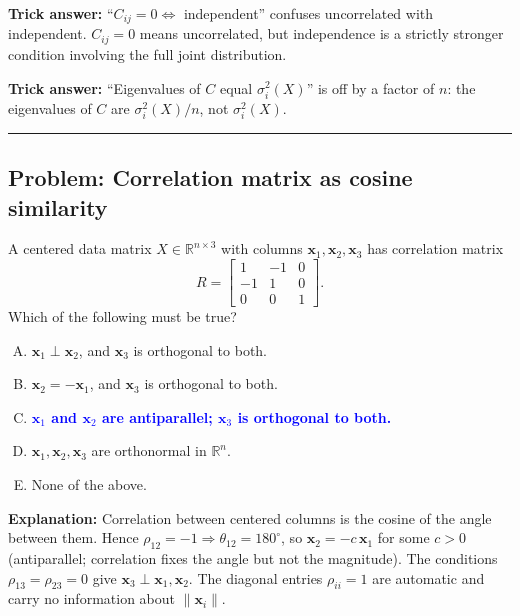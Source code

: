 \documentclass[12pt]{amsart}
\newcommand{\divider}{
  \vspace{-1em}
  \noindent
  \raisebox{-0.15ex}{\textbullet}%
  \hspace{0.5em}%
  \rule[0.5ex]{0.95\textwidth}{1.0pt}%
  \hspace{0.5em}%
  \raisebox{-0.15ex}{\textbullet}%
  \vspace{0em}
}
\begin{document}
\textbf{Trick answer:}
``$C_{ij} = 0 \Leftrightarrow$ independent'' confuses uncorrelated with
independent. $C_{ij} = 0$ means uncorrelated, but independence is a strictly
stronger condition involving the full joint distribution.

\textbf{Trick answer:}
``Eigenvalues of $C$ equal $\sigma_i^2(X)$'' is off by a factor of $n$:
the eigenvalues of $C$ are $\sigma_i^2(X)/n$, not $\sigma_i^2(X)$.

\divider

\subsection*{Problem: Correlation matrix as cosine similarity}

A centered data matrix $X \in \mathbb{R}^{n \times 3}$ with columns
$\mathbf{x}_1, \mathbf{x}_2, \mathbf{x}_3$ has correlation matrix
$$R = \begin{bmatrix} 1 & -1 & 0 \\ -1 & 1 & 0 \\ 0 & 0 & 1 \end{bmatrix}.$$
Which of the following must be true?

\begin{enumerate}[(A)]
\item $\mathbf{x}_1 \perp \mathbf{x}_2$, and $\mathbf{x}_3$ is orthogonal to both.
\item $\mathbf{x}_2 = -\mathbf{x}_1$, and $\mathbf{x}_3$ is orthogonal to both.
\item \textcolor{blue}{\textbf{$\mathbf{x}_1$ and $\mathbf{x}_2$ are antiparallel; $\mathbf{x}_3$ is orthogonal to both.}}
\item $\mathbf{x}_1, \mathbf{x}_2, \mathbf{x}_3$ are orthonormal in $\mathbb{R}^n$.
\item None of the above.
\end{enumerate}

\textbf{Explanation:}
Correlation between centered columns is the cosine of the angle between them.
Hence $\rho_{12} = -1 \Rightarrow \theta_{12} = 180^\circ$, so
$\mathbf{x}_2 = -c\,\mathbf{x}_1$ for some $c > 0$ (antiparallel; correlation
fixes the angle but not the magnitude). The conditions $\rho_{13} = \rho_{23} = 0$
give $\mathbf{x}_3 \perp \mathbf{x}_1, \mathbf{x}_2$. The diagonal entries
$\rho_{ii} = 1$ are automatic and carry no information about $\|\mathbf{x}_i\|$.
\end{document}
